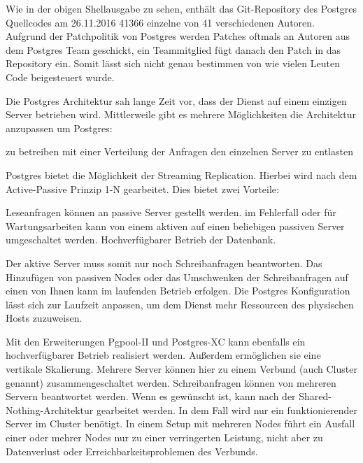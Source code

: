 Wie in der obigen Shellausgabe zu sehen, enthält das \gls{Git}-\gls{Repository}
des Postgres Quellcodes am 26.11.2016 41366 einzelne 
von 41 verschiedenen Autoren. Aufgrund der Patchpolitik von Postgres werden
Patches oftmals an Autoren aus dem Postgres Team geschickt, ein Teammitglied
fügt danach den Patch in das Repository ein. Somit lässt sich nicht genau
bestimmen von wie vielen Leuten Code beigesteuert wurde.

Die Postgres Architektur sah lange Zeit vor, dass der Dienst auf einem einzigen
Server betrieben wird. Mittlerweile gibt es mehrere Möglichkeiten die
Architektur anzupassen um Postgres:

\begin{outline}
  \1  zu betreiben
  \1 
  \1 mit einer Verteilung der Anfragen den einzelnen Server zu entlasten
\end{outline}

Postgres bietet die Möglichkeit der \gls{Streaming Replication}. Hierbei wird
nach dem \gls{Active-Passive Prinzip} 1-N gearbeitet. Dies bietet zwei
Vorteile:

\begin{outline}
  \1 Leseanfragen können an passive Server gestellt werden.
  \1 im Fehlerfall oder für Wartungsarbeiten kann von einem aktiven auf einen
  beliebigen passiven Server umgeschaltet werden.
  \1 Hochverfügbarer Betrieb der Datenbank.
\end{outline}

Der aktive Server muss somit nur noch Schreibanfragen beantworten. Das
Hinzufügen von passiven Nodes oder das Umschwenken der Schreibanfragen auf
einen von Ihnen kann im laufenden Betrieb erfolgen. Die Postgres Konfiguration
lässt sich zur Laufzeit anpassen, um dem Dienst mehr Ressourcen des physischen
Hosts zuzuweisen.

Mit den Erweiterungen \gls{Pgpool-II} und \gls{Postgres-XC} kann ebenfalls ein
hochverfügbarer Betrieb realisiert werden. Außerdem ermöglichen sie eine
vertikale \gls{Skalierung}. Mehrere Server können hier zu einem Verbund (auch
Cluster genannt) zusammengeschaltet werden. Schreibanfragen können von mehreren
Servern beantwortet werden. Wenn es gewünscht ist, kann nach der
\gls{Shared-Nothing-Architektur} gearbeitet werden. In dem Fall wird nur ein
funktionierender Server im Cluster benötigt. In einem Setup mit mehreren Nodes
führt ein Ausfall einer oder mehrer Nodes nur zu einer verringerten Leistung,
nicht aber zu Datenverlust oder Erreichbarkeitsproblemen des Verbunds.
\tm%

